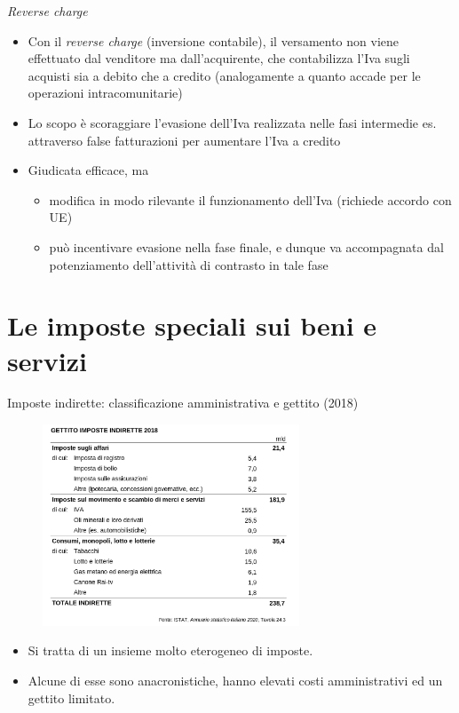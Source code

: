\documentclass[11pt,italian]{beamer}
\begin{document}
\begin{frame}{\emph{Reverse charge}}
\begin{itemize}
\item Con il \emph{reverse charge} (inversione contabile), il versamento non viene
effettuato dal venditore ma dall'acquirente, che contabilizza l'Iva sugli
acquisti sia a debito che a credito (analogamente a quanto accade per le
operazioni intracomunitarie)
\item Lo scopo è scoraggiare l'evasione dell'Iva realizzata nelle fasi intermedie
es. attraverso false fatturazioni per aumentare l'Iva a credito
\item Giudicata efficace, ma
\begin{itemize}
\item modifica in modo rilevante il funzionamento dell'Iva (richiede accordo con
UE)
\item può incentivare evasione nella fase finale, e dunque va accompagnata dal
potenziamento dell'attività di contrasto in tale fase
\end{itemize}
\end{itemize}
\end{frame}


\section{Le imposte speciali sui beni e servizi}


\begin{frame}{Imposte indirette: classificazione amministrativa e gettito (2018)}
\begin{figure}[htbp]
\centering
\includegraphics[height=6cm]{./figure/imposte-indirette-2018.png}
\end{figure}

\begin{itemize}
\item Si tratta di un insieme molto eterogeneo di imposte.
\item Alcune di esse sono anacronistiche, hanno elevati costi amministrativi ed un
gettito limitato.
\end{itemize}
\end{frame}
\end{document}
